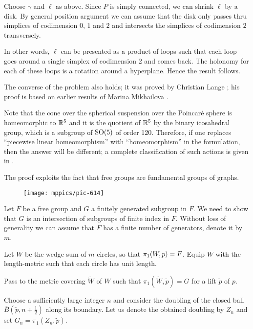 Choose $\gamma$ and $\ell$ as above.
Since $P$ is simply connected, we can shrink $\ell$ by a disk.
By general position argument we can assume that the disk 
only passes thru simplices of codimension $0$, $1$ and $2$
and intersects the simplices of codimension $2$ transversely.

In other words, $\ell$ can be presented as a product of 
loops such that each loop goes around a single simplex of codimension $2$ and comes back.
The holonomy for each of these loops is a rotation around a hyperplane.
Hence the result follows.
\qeds

The converse of the problem also holds;
it was proved by Christian Lange \cite{lange};
his proof is based on earlier results of 
Marina Mikhailova \cite{mikhailova}.

Note that the cone over the spherical suspension over the Poincaré sphere is homeomorphic to $\mathbb{R}^5$ and it is the quotient of $\mathbb{R}^5$ by the binary icosahedral group, which is a subgroup of $\mathrm{SO}(5)$ of order 120. 
Therefore, 
if one replaces ``piecewise linear homeomorphism'' with ``homeomorphism'' in the formulation, 
then the answer will be different; 
a complete classification of such actions is given in \cite{lange}.

The proof exploits the fact that free groups are fundamental groups of graphs.


\begin{wrapfigure}{o}{38 mm}
\vskip-4mm
\centering
\texttt{[image: mppics/pic-614]}
\end{wrapfigure}

\medskip

Let $F$ be a free group and $G$ a finitely generated subgroup in $F$.
We need to show that $G$ is an intersection of subgroups of finite index in $F$.
Without loss of generality we can assume that $F$ has a finite number of generators, denote it by $m$.

Let $W$ be the wedge sum of $m$ circles, 
so that $\pi_1(W,p)\z=F$.
Equip $W$ with the length-metric 
such that each circle has unit length.

Pass to the metric covering $\tilde W$ of $W$ 
such that  $\pi_1(\tilde W,\tilde p)=G$ 
for a lift $\tilde p$ of $p$.

Choose a sufficiently large integer $n$ and consider the doubling of the closed ball $\bar B(\tilde p,n+\frac12)$ along  its boundary.
Let us denote the obtained doubling by $Z_n$ and set $G_n=\pi_1(Z_n,\tilde p)$.

